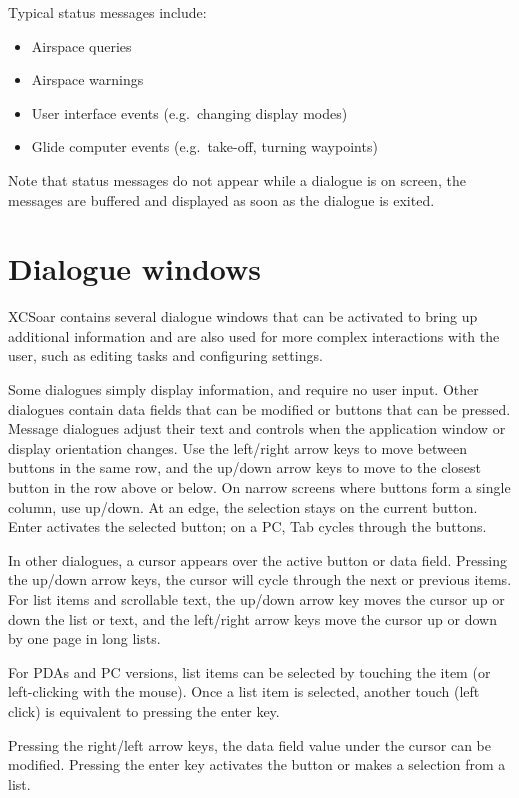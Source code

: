 Typical status messages include:
\begin{itemize}
\item Airspace queries
\item Airspace warnings
\item User interface events (e.g.\ changing display modes)
\item Glide computer events (e.g.\ take-off, turning waypoints)
\end{itemize}

Note that status messages do not appear while a dialogue is on screen, the
messages are buffered and displayed as soon as the dialogue is exited.


\section{Dialogue windows}\label{sec:dialog-windows}

XCSoar contains several dialogue windows that can be activated to bring up
additional information and are also used for more complex interactions with the
user, such as editing tasks and configuring settings.

Some dialogues simply display information, and require no user input. Other
dialogues contain data fields that can be modified or buttons that can be pressed.  
Message dialogues adjust their text and controls when the application window
or display orientation changes. Use the left/right arrow keys to move between
buttons in the same row, and the up/down arrow keys to move to the closest
button in the row above or below. On narrow screens where buttons form a
single column, use up/down. At an edge, the selection stays on the current
button. Enter activates the selected button; on a PC, Tab cycles through the
buttons.

In other dialogues, a cursor appears over the active button or data field.
Pressing the up/down
arrow keys, the cursor will cycle
through the next or previous items. For list items and scrollable text, the
up/down arrow key moves the cursor up or down the list or text, and the
left/right arrow keys move the cursor up or down by one page in long lists.

For PDAs and PC versions, list items can be selected by touching the item (or
left-clicking with the mouse). Once a list item is selected, another touch
(left click) is equivalent to pressing the enter key.

Pressing the right/left arrow keys, the data field value under the
cursor can be modified. Pressing the enter key activates the button or
makes a selection from a list.

